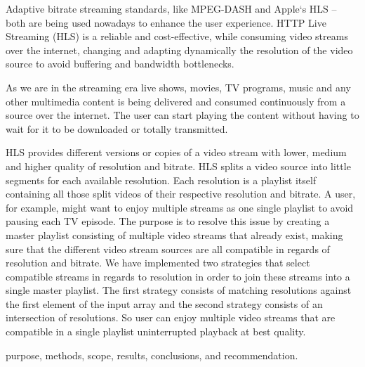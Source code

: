 Adaptive bitrate streaming standards, like MPEG-DASH and Apple‘s HLS – both are being used nowadays to enhance the user experience. HTTP Live Streaming (HLS) is a reliable and cost-effective, while consuming video streams over the internet, changing and adapting dynamically the resolution of the video source to avoid buffering and bandwidth bottlenecks.
 
As we are in the streaming era live shows, movies, TV programs, music and any other multimedia content is being delivered and consumed continuously from a source over the internet. The user can start playing the content without having to wait for it to be downloaded or totally transmitted.

HLS provides different versions or copies of a video stream with lower, medium and higher quality of resolution and bitrate. HLS splits a video source into little segments for each available resolution. Each resolution is a playlist itself containing all those split videos of their respective resolution and bitrate. A user, for example, might want to enjoy multiple streams as one single playlist to avoid pausing each TV episode.
The purpose is to resolve this issue by creating a master playlist consisting of multiple video streams that already exist, making sure that the different video stream sources are all compatible in regards of resolution and bitrate. We have implemented two strategies that select compatible streams in regards to resolution in order to join these streams into a single master playlist. The first strategy consists of matching resolutions against the first element of the input array and the second strategy consists of an intersection of resolutions. So user can enjoy multiple video streams that are compatible in a single playlist uninterrupted playback at best quality.

 


\begin{IEEEkeywords}
purpose, methods, scope, results, conclusions, and recommendation. 

\end{IEEEkeywords}